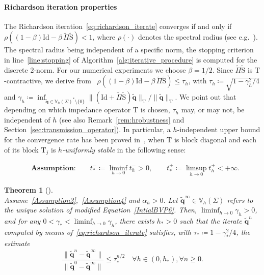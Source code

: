 \documentclass[a4paper,11pt]{article}
\newcommand{\Id}{\mathrm{Id}}
\newcommand{\mT}{\mathrm{T}}
\newcommand{\mS}{\mathrm{S}}
\newcommand{\mbV}{\mathbb{V}}
\newcommand{\bq}{\boldsymbol{q}}
\newcommand{\bfq}{\mathbf{q}}
\newtheorem{thm}[defn]{Theorem}
\begin{document}
\paragraph{Richardson iteration properties}
The Richardson iteration~\eqref{eq:richardson_iterate} converges if and only if \(\rho((1-\beta)\Id - \beta \, \tilde{\Pi} \tilde{\mS}) < 1\), where \(\rho(\cdot)\) denotes the spectral radius (see e.g.~\cite[Section~3.5]{Hackbusch2016ISL}). The spectral radius being independent of a specific norm, the stopping criterion in line~\ref{line:stopping} of Algorithm~\ref{alg:iterative_procedure} is computed for the discrete \(2\)-norm. 
For our numerical experiments we choose \(\beta=1/2\). Since \(\tilde{\Pi} \tilde{\mS}\) is \(\mT\)-contractive, we derive from~\cite[Corollary~3.33]{Hackbusch2016ISL} \(\rho((1-\beta)\Id - \beta \, \tilde{\Pi} \tilde{\mS}) \leq \tau_h\), with \(\tau_h \coloneqq \sqrt{1- \gamma_h^2/4}\) and
\(
  \gamma_h \coloneqq \inf_{\tilde{\bq} \in \mbV_h(\Sigma)^*\setminus\{0\}} \lVert (\Id + \tilde{\Pi} \tilde{\mS}) \tilde{\bq} \rVert_{\mT}/ \lVert \tilde{\bq} \rVert_{\mT}
\). 
We point out that depending on which impedance operator \(\mT\) is chosen, \(\tau_h \) may, or may not, be independent of \(h\) (see also Remark~\ref{rem:hrobustness} and Section~\ref{sec:transmission_operator}). In particular, a \(h\)-independent upper bound for the convergence rate has been proved in~\cite{MR4433119}, when \(\mT\) is block diagonal and each of its block \(\mT_j\) is \emph{\(h\)-uniformly stable} in the following sense:

\begin{equation}\label{Assumption4}
  \begin{aligned}
    & \textbf{Assumption:} \qquad
    t_*^- \coloneqq \liminf_{h \to 0} t_h^- > 0,\qquad t_*^+ \coloneqq \limsup_{h \to 0} t_h^+ < +\infty.
  \end{aligned}
\end{equation}

\begin{thm}[{\cite[Corollary~10.7]{MR4433119}}]\label{thm:richardson_upper_bound}\quad\\
   Assume~\eqref{Assumption2},~\eqref{Assumption4} and \(\alpha_h > 0\).
  Let \(\tilde{\bfq}^{\infty} \in \mbV_h(\Sigma)\) refers to the unique solution of modified Equation~\eqref{IntialBVP6}.
  Then, \(\liminf_{h \to 0} \gamma_h > 0\), and for any \(0 < \gamma_* < \liminf_{h \to 0} \gamma_h\), there exists \(h_* > 0\) such that the iterate \(\tilde{\bfq}^n\) computed by means of~\eqref{eq:richardson_iterate} satisfies, with \(\tau_* \coloneqq 1 - \gamma_*^2/4\), the estimate
  \begin{align*}
    \dfrac{\lVert \tilde{\bfq}^n - \tilde{\bfq}^{\infty} \rVert}{\lVert \tilde{\bfq}^0 - \tilde{\bfq}^{\infty} \rVert} \leq \tau_*^{n/2} \quad \forall h \in (0, h_*), \forall n \geq 0.
  \end{align*}
\end{thm}
\end{document}
